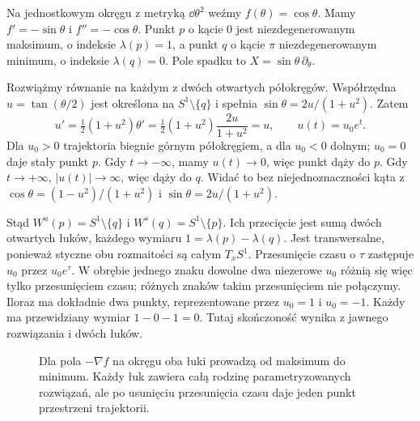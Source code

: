 \begin{przyklad}
\label{prz:smale-okrag-19}
Na jednostkowym okręgu z metryką $\dd\theta^2$ weźmy
$f(\theta)=\cos\theta$.
Mamy $f'=-\sin\theta$ i $f''=-\cos\theta$.
Punkt $p$ o kącie $0$ jest niezdegenerowanym maksimum,
o indeksie $\lambda(p)=1$, a punkt $q$ o kącie $\pi$
niezdegenerowanym minimum, o indeksie $\lambda(q)=0$.
Pole spadku to $X=\sin\theta\,\partial_\theta$.

Rozwiążmy równanie na każdym z dwóch otwartych półokręgów.
Współrzędna $u=\tan(\theta/2)$ jest określona na
$S^1\setminus\{q\}$ i spełnia
$\sin\theta=2u/(1+u^2)$.
Zatem
\[
 u'=\tfrac12(1+u^2)\theta'
    =\tfrac12(1+u^2)\frac{2u}{1+u^2}=u,
 \qquad u(t)=u_0e^t.
\]
Dla $u_0>0$ trajektoria biegnie górnym półokręgiem,
a dla $u_0<0$ dolnym; $u_0=0$ daje stały punkt $p$.
Gdy $t\to-\infty$, mamy $u(t)\to0$, więc punkt dąży do $p$.
Gdy $t\to+\infty$, $|u(t)|\to\infty$, więc dąży do $q$.
Widać to bez niejednoznaczności kąta z
$\cos\theta=(1-u^2)/(1+u^2)$ i
$\sin\theta=2u/(1+u^2)$.

Stąd $W^u(p)=S^1\setminus\{q\}$ i
$W^s(q)=S^1\setminus\{p\}$.
Ich przecięcie jest sumą dwóch otwartych łuków,
każdego wymiaru $1=\lambda(p)-\lambda(q)$.
Jest transwersalne, ponieważ styczne obu rozmaitości
są całym $T_xS^1$.
Przesunięcie czasu o $\tau$ zastępuje $u_0$ przez $u_0e^\tau$.
W obrębie jednego znaku dowolne dwa niezerowe $u_0$
różnią się więc tylko przesunięciem czasu; różnych znaków
takim przesunięciem nie połączymy.
Iloraz ma dokładnie dwa punkty, reprezentowane przez $u_0=1$
i $u_0=-1$. Każdy ma przewidziany wymiar
$1-0-1=0$. Tutaj skończoność wynika z jawnego
rozwiązania i dwóch łuków.
\end{przyklad}

\begin{figure}[H]
\centering
{}
\caption{Dla pola $-\nabla f$ na okręgu oba łuki prowadzą
od maksimum do minimum. Każdy łuk zawiera całą rodzinę
parametryzowanych rozwiązań, ale po usunięciu przesunięcia
czasu daje jeden punkt przestrzeni trajektorii.}
\label{fig:smale-okrag-19}
\end{figure}

